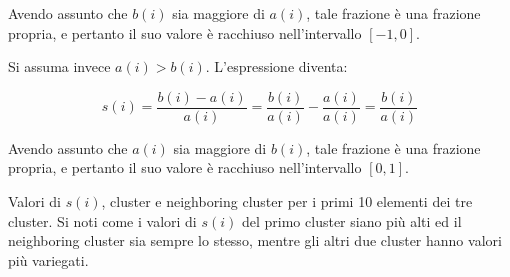 \documentclass[12pt]{report}
\begin{document}
			Avendo assunto che $b(i)$ sia maggiore di $a(i)$, tale frazione è una
			frazione propria, e pertanto il suo valore è racchiuso nell'intervallo
			$[-1, 0]$.

			Si assuma invece $a(i) > b(i)$. L'espressione diventa:

			\begin{equation*}
				s(i) = \frac{b(i) - a(i)}{a(i)} =
				\frac{b(i)}{a(i)} - \frac{a(i)}{a(i)} =
				\frac{b(i)}{a(i)}
			\end{equation*}

			Avendo assunto che $a(i)$ sia maggiore di $b(i)$, tale frazione è una
			frazione propria, e pertanto il suo valore è racchiuso nell'intervallo
			$[0, 1]$.


			\begin{table}
				\begin{boxedminipage}{0.25\linewidth}
				\end{boxedminipage}
				\begin{boxedminipage}{0.25\linewidth}
				\end{boxedminipage}
				\begin{boxedminipage}{0.25\linewidth}
				\end{boxedminipage}
				\caption{Valori di $s(i)$, cluster e neighboring cluster per
				i primi 10 elementi dei tre cluster. Si noti come i valori
				di $s(i)$ del primo cluster siano più alti ed il neighboring
				cluster sia sempre lo stesso, mentre gli altri due cluster
				hanno valori più variegati.}
				\label{tab:iris}
			\end{table}
\end{document}
